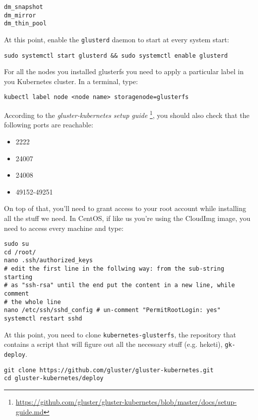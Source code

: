 \begin{lstlisting}
dm_snapshot
dm_mirror
dm_thin_pool
\end{lstlisting}

At this point, enable the \texttt{glusterd} daemon to start at every
system start:

\begin{lstlisting}
sudo systemctl start glusterd && sudo systemctl enable glusterd
\end{lstlisting}

For all the nodes you installed glusterfs you need to apply a particular
label in you Kubernetes cluster. In a terminal, type:

\begin{lstlisting}
kubectl label node <node name> storagenode=glusterfs
\end{lstlisting}

According to the \emph{gluster-kubernetes setup guide}
\footnote{\url{https://github.com/gluster/gluster-kubernetes/blob/master/docs/setup-guide.md}},
you should also check that the following ports are reachable:

\begin{itemize}
\item 2222
\item 24007
\item 24008
\item 49152-49251
\end{itemize}

On top of that, you'll need to grant access to your root account while
installing all the stuff we need. In CentOS, if like us you're using the
CloudImg image, you need to access every machine and type:

\begin{lstlisting}
sudo su
cd /root/
nano .ssh/authorized_keys
# edit the first line in the follwing way: from the sub-string starting
# as "ssh-rsa" until the end put the content in a new line, while comment
# the whole line
nano /etc/ssh/sshd_config # un-comment "PermitRootLogin: yes"
systemctl restart sshd
\end{lstlisting}

At this point, you need to clone \texttt{kubernetes-glusterfs}, the repository
that contains a script that will figure out all the necessary stuff
(e.g. heketi), \texttt{gk-deploy}.

\begin{lstlisting}
git clone https://github.com/gluster/gluster-kubernetes.git
cd gluster-kubernetes/deploy
\end{lstlisting}

